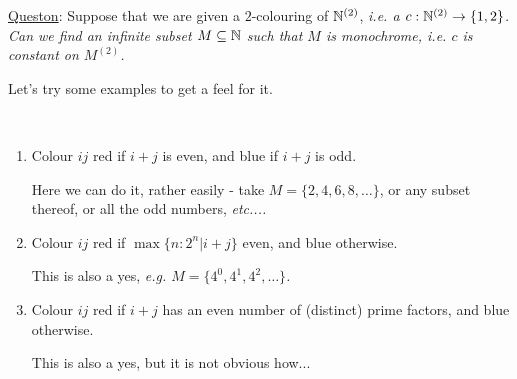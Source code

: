 \documentclass[10pt]{article}
\begin{document}
\underline{Queston}: Suppose that we are given a $2$-colouring of $\mathbb{N}^{(2)}$, \it{i.e.} a $c:\mathbb{N}^{(2)}\rightarrow\{1,2\}$. Can we find an infinite subset $M\subseteq \mathbb{N}$ such that $M$ is monochrome, \it{i.e.} $c$ is constant on $M^{(2)}$.

Let's try some examples to get a feel for it.

\begin{remark*}[Examples]\ 
    \begin{enumerate}
        \item Colour $ij$ red if $i + j$ is even, and blue if $i+j$ is odd.
        
        Here we can do it, rather easily - take $M = \{2,4,6,8,\dots\}$, or any subset thereof, or all the odd numbers, \it{etc...}.

        \item Colour $ij$ red if $\max\{n:2^n|i+j\}$ even, and blue otherwise.
        
        This is also a yes, \it{e.g.} $M = \{4^0,4^1,4^2,\dots\}$.

        \item Colour $ij$ red if $i+j$ has an even number of (distinct) prime factors, and blue otherwise.
        
        This is also a yes, but it is not obvious how...
    \end{enumerate}
\end{remark*}
\end{document}
